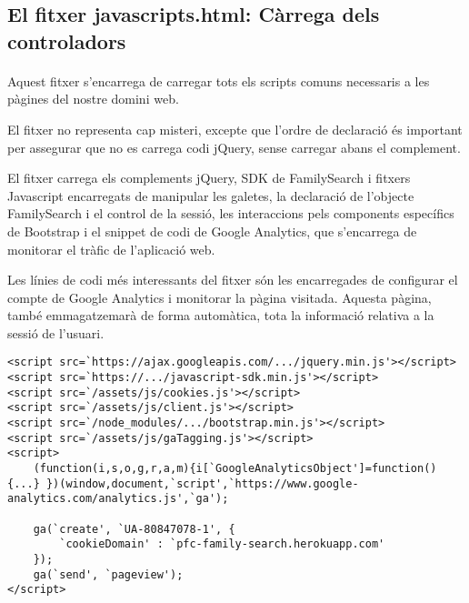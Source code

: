 \subsection{El fitxer javascripts.html: Càrrega dels controladors}

    \paragraph{}
    Aquest fitxer s'encarrega de carregar tots els scripts comuns necessaris a les pàgines del nostre domini web.

    El fitxer no representa cap misteri, excepte que l'ordre de declaració és important per assegurar que no es carrega codi jQuery, sense carregar abans el complement.

    El fitxer carrega els complements jQuery, SDK de FamilySearch i fitxers Javascript encarregats de manipular les galetes, la declaració de l'objecte FamilySearch i el control de la sessió, les interaccions pels components específics de Bootstrap i el snippet de codi de Google Analytics, que s'encarrega de monitorar el tràfic de l'aplicació web.

    Les línies de codi més interessants del fitxer són les encarregades de configurar el compte de Google Analytics i monitorar la pàgina visitada. Aquesta pàgina, també emmagatzemarà de forma automàtica, tota la informació relativa a la sessió de l'usuari.

    \begin{lstlisting}[style=rawOwn,caption={Càrrega general de controladors per totes les pàgines}]
<script src=`https://ajax.googleapis.com/.../jquery.min.js'></script>
<script src=`https://.../javascript-sdk.min.js'></script>
<script src=`/assets/js/cookies.js'></script>
<script src=`/assets/js/client.js'></script>
<script src=`/node_modules/.../bootstrap.min.js'></script>
<script src=`/assets/js/gaTagging.js'></script>
<script>
    (function(i,s,o,g,r,a,m){i[`GoogleAnalyticsObject']=function(){...} })(window,document,`script',`https://www.google-analytics.com/analytics.js',`ga');

    ga(`create', `UA-80847078-1', {
        `cookieDomain' : `pfc-family-search.herokuapp.com'
    });
    ga(`send', `pageview');
</script>
    \end{lstlisting}
